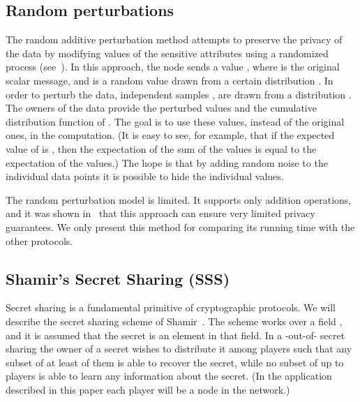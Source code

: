 \documentclass[10pt]{svjour3}
\begin{document}
\subsection{Random perturbations}
The random additive perturbation method attempts to preserve the
privacy of the data by modifying values of the sensitive
attributes using a randomized process
(see~\cite{AS,DiNi,RandomNoise}). In this approach, the node sends
a value , where  is the original scalar message, and
 is a random value drawn from a certain distribution . In
order to perturb the data,  independent samples , are drawn from a distribution . The owners of
the data provide the perturbed values  and the cumulative distribution function  of .
The goal is to use these values, instead of the original ones, in
the computation. (It is easy to see, for example, that if the
expected value of  is , then the expectation of the sum of
the  values is equal to the expectation of the 
values.) The hope is that by adding random noise to the individual
data points it is possible to hide the individual values.



The random perturbation model is limited. It supports only
addition operations, and it was shown in~\cite{DiNi} that this
approach can ensure very limited privacy guarantees. We only
present
this method
for
comparing its running time with the other protocols.

\subsection{Shamir's Secret Sharing (SSS)}
Secret sharing is a fundamental primitive of cryptographic
protocols. We will describe the  secret sharing scheme of
Shamir~\cite{SSS}. The scheme works over a field , and it is
assumed that the secret  is an element in that field. In a
-out-of- secret sharing the owner of a secret wishes to
distribute it among  players such that any subset of at least  of
them is able to recover the secret, while no subset of up to 
players is able to learn any information about the secret. (In the
application described in this paper each player will be a node in the
network.)
\end{document}
